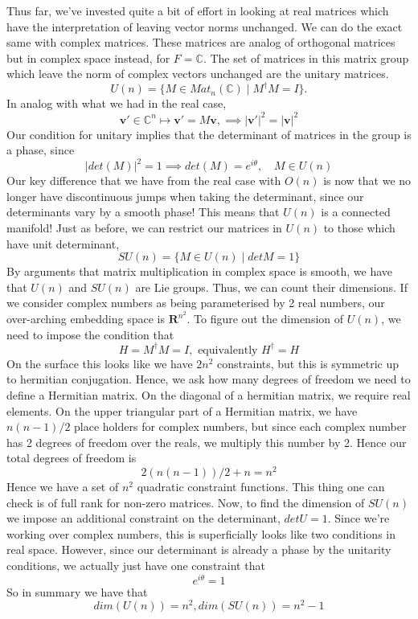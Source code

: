 \documentclass[11pt, oneside]{article}   	%
\theoremstyle{slanted}
\begin{document}
Thus far, we've invested quite a bit of effort in looking at real matrices which have the interpretation of leaving vector norms unchanged. We can do the exact same with complex matrices. These matrices are analog of orthogonal matrices but in complex space instead, for $F = \mathbb{C}$. The set of matrices in this matrix group which leave the norm of complex vectors unchanged are the unitary matrices. 
\[
	U(n) = \{ M \in Mat_n (\mathbb{C}) \mid M^{\dagger} M = I \}. 
\] In analog with what we had in the real case, 
\[ 	
	\mathbf{v}' \in \mathbb{C}^n \mapsto \mathbf{v}' = M\mathbf{ v}, \implies  |\mathbf{v}'|^2 = |\mathbf{v}|^2 
\] Our condition for unitary implies that the determinant of matrices in the group is a phase, since 
\[ 
	| det ( M ) |^2 = 1 \implies det ( M) = e^{ i \theta}, \quad M \in U ( n) 
\] Our key difference that we have from the real case with $O(n)$ is now that we no longer have discontinuous jumps when taking the determinant, since our determinants vary by a smooth phase! This means that $U( n)$ is a connected manifold! Just as before, we can restrict our matrices in $U( n )$ to those which have unit determinant, 
\[ 
	SU ( n ) = \{ M \in U ( n ) \mid det M = 1\} 
\] 
By arguments that matrix multiplication in complex space is smooth, we have that $U ( n)$ and $SU ( n) $ are Lie groups. Thus, we can count their dimensions. If we consider complex numbers as being parameterised by 2 real numbers, our over-arching embedding space is $\mathbf{R}^{ n^2 } $. To figure out the dimension of $U (n)$, we need to impose the condition that 
\[ 
	 H = M^\dagger M  = I, \text{ equivalently } H^\dagger = H 
\]  On the surface this looks like we have $2 n^2 $ constraints, but this is symmetric up to hermitian conjugation. Hence, we ask how many degrees of freedom we need to define a Hermitian matrix. On the diagonal of a hermitian matrix, we require real elements. On the upper triangular part of a Hermitian matrix, we have $n (n -1 ) /2 $ place holders for complex numbers, but since each complex number has 2 degrees of freedom over the reals, we multiply this number by 2. Hence our total degrees of freedom is 
\[ 
	2 ( n ( n  -1) ) / 2 + n  = n^2 
\] Hence we have a set of $n^2$ quadratic constraint functions. This thing one can check is of full rank for non-zero matrices. Now, to find the dimension of $SU ( n)$ we impose an additional constraint on the determinant, 
$det U = 1$. Since we're working over complex numbers, this is superficially looks like two conditions in real space. However, since our determinant is already a phase by the unitarity conditions, we actually just have one constraint that 
\[ 
	e^{ i \theta } = 1 
\] So in summary we have that 
\[ 
	dim ( U ( n)) = n^2, dim ( SU ( n)) = n^2  - 1
\] 
\end{document}
